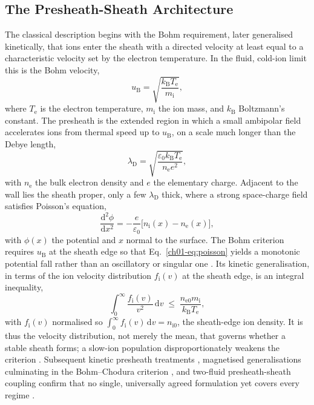 \subsection{The Presheath-Sheath Architecture}

The classical description begins with the Bohm requirement, later generalised kinetically, that ions enter the sheath with a directed velocity at least equal to a characteristic velocity set by the electron temperature. In the fluid, cold-ion limit this is the Bohm velocity,
\begin{equation}
u_{\mathrm{B}} = \sqrt{\frac{k_{\mathrm{B}} T_{\mathrm{e}}}{m_{\mathrm{i}}}},
\label{eq:bohm-velocity}
\end{equation}
where $T_{\mathrm{e}}$ is the electron temperature, $m_{\mathrm{i}}$ the ion mass, and $k_{\mathrm{B}}$ Boltzmann's constant. The presheath is the extended region in which a small ambipolar field accelerates ions from thermal speed up to $u_{\mathrm{B}}$, on a scale much longer than the Debye length,
\begin{equation}
\lambda_{\mathrm{D}} = \sqrt{\frac{\varepsilon_{0} k_{\mathrm{B}} T_{\mathrm{e}}}{n_{\mathrm{e}} e^{2}}},
\label{ch01-eq:debye}
\end{equation}
with $n_{\mathrm{e}}$ the bulk electron density and $e$ the elementary charge. Adjacent to the wall lies the sheath proper, only a few $\lambda_{\mathrm{D}}$ thick, where a strong space-charge field satisfies Poisson's equation,
\begin{equation}
\frac{\mathrm{d}^{2}\phi}{\mathrm{d}x^{2}} = -\frac{e}{\varepsilon_{0}}\bigl[n_{\mathrm{i}}(x) - n_{\mathrm{e}}(x)\bigr],
\label{ch01-eq:poisson}
\end{equation}
with $\phi(x)$ the potential and $x$ normal to the surface. The Bohm criterion requires $u_{\mathrm{B}}$ at the sheath edge so that Eq.~\eqref{ch01-eq:poisson} yields a monotonic potential fall rather than an oscillatory or singular one \cite{ref0001}. Its kinetic generalisation, in terms of the ion velocity distribution $f_{\mathrm{i}}(v)$ at the sheath edge, is an integral inequality,
\begin{equation}
\int_{0}^{\infty} \frac{f_{\mathrm{i}}(v)}{v^{2}}\,\mathrm{d}v \;\le\; \frac{n_{\mathrm{e}0} m_{\mathrm{i}}}{k_{\mathrm{B}} T_{\mathrm{e}}},
\label{eq:kinetic-bohm-intro}
\end{equation}
with $f_{\mathrm{i}}(v)$ normalised so $\int_0^\infty f_{\mathrm{i}}(v)\,\mathrm{d}v = n_{\mathrm{i}0}$, the sheath-edge ion density. It is thus the velocity distribution, not merely the mean, that governs whether a stable sheath forms; a slow-ion population disproportionately weakens the criterion \cite{ref0001,ref0015}. Subsequent kinetic presheath treatments \cite{ref0001}, magnetised generalisations culminating in the Bohm--Chodura criterion \cite{ref0017}, and two-fluid presheath-sheath coupling \cite{ref0023} confirm that no single, universally agreed formulation yet covers every regime \cite{ref0015}.

